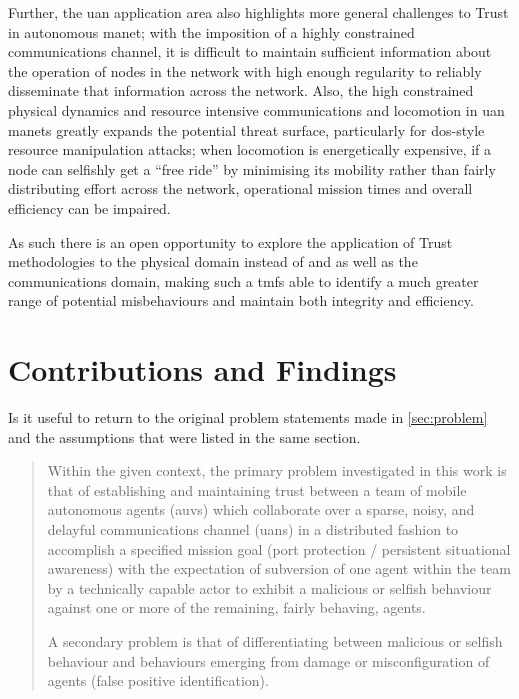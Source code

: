 Further, the \gls{uan} application area also highlights more general challenges to Trust in autonomous \gls{manet}; with the imposition of a highly constrained communications channel, it is difficult to maintain sufficient information about the operation of nodes in the network with high enough regularity to reliably disseminate that information across the network.
Also, the high constrained physical dynamics and resource intensive communications and locomotion in \gls{uan} \glspl{manet} greatly expands the potential threat surface, particularly for \gls{dos}-style resource manipulation attacks; when locomotion is energetically expensive, if a node can selfishly get a ``free ride'' by minimising its mobility rather than fairly distributing effort across the network, operational mission times and overall efficiency can be impaired. 

As such there is an open opportunity to explore the application of Trust methodologies to the physical domain instead of and as well as the communications domain, making such a \glspl{tmf} able to identify a much greater range of potential misbehaviours and maintain both integrity and efficiency.


\section{Contributions and Findings}
Is it useful to return to the original problem statements made in \autoref{sec:problem} and the assumptions that were listed in the same section.

\begin{quotation}
	
	Within the given context, the primary problem investigated in this work is that of establishing and maintaining trust between a team of mobile autonomous agents (\glspl{auv}) which collaborate over a sparse, noisy, and delayful communications channel (\glspl{uan}) in a distributed fashion to accomplish a specified mission goal (port protection / persistent situational awareness) with the expectation of subversion of one agent within the team by a technically capable actor to exhibit a malicious or selfish behaviour against one or more of the remaining, fairly behaving, agents. 
	
	A secondary problem is that of differentiating between malicious or selfish behaviour and behaviours emerging from damage or misconfiguration of agents (false positive identification).
	
\end{quotation}

